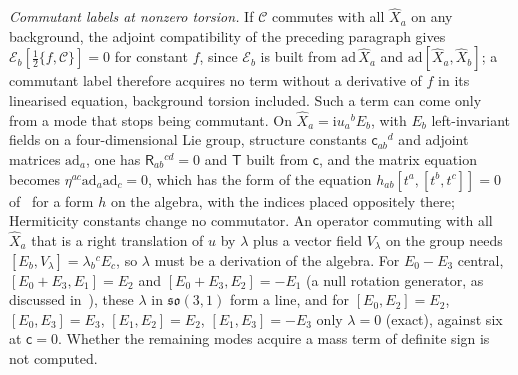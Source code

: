 \emph{Commutant labels at nonzero torsion.} If \(\mathcal C\) commutes with all \(\hat X_a\) on any background, the adjoint compatibility of the preceding paragraph gives \(\mathcal E_b[\tfrac12\{f,\mathcal C\}]=0\) for constant \(f\), since \(\mathcal E_b\) is built from \(\mathrm{ad}\,\hat X_a\) and \(\mathrm{ad}[\hat X_a,\hat X_b]\); a commutant label therefore acquires no term without a derivative of \(f\) in its linearised equation, background torsion included. Such a term can come only from a mode that stops being commutant. On \(\hat X_a=\mathrm iu_a{}^bE_b\), with \(E_b\) left-invariant fields on a four-dimensional Lie group, structure constants \(\mathsf c_{ab}{}^d\) and adjoint matrices \(\mathrm{ad}_a\), one has \(\mathsf R_{ab}{}^{cd}=0\) and \(\mathsf T\) built from \(\mathsf c\), and the matrix equation becomes \(\eta^{ac}\mathrm{ad}_a\mathrm{ad}_c=0\), which has the form of the equation \(h_{ab}[t^a,[t^b,t^c]]=0\) of~\cite{Liao2026} for a form \(h\) on the algebra, with the indices placed oppositely there; Hermiticity constants change no commutator. An operator commuting with all \(\hat X_a\) that is a right translation of \(u\) by \(\lambda\) plus a vector field \(V_\lambda\) on the group needs \([E_b,V_\lambda]=\lambda_b{}^cE_c\), so \(\lambda\) must be a derivation of the algebra. For \(E_0-E_3\) central, \([E_0+E_3,E_1]=E_2\) and \([E_0+E_3,E_2]=-E_1\) (a null rotation generator, as discussed in~\cite{Liao2026}), these \(\lambda\) in \(\mathfrak{so}(3,1)\) form a line, and for \([E_0,E_2]=E_2\), \([E_0,E_3]=E_3\), \([E_1,E_2]=E_2\), \([E_1,E_3]=-E_3\) only \(\lambda=0\) (exact), against six at \(\mathsf c=0\). Whether the remaining modes acquire a mass term of definite sign is not computed.

